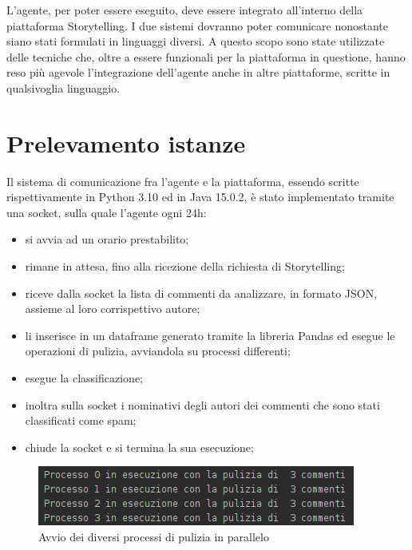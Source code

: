 \documentclass{report}
\begin{document}
    L'agente, per poter essere eseguito, deve essere integrato all'interno della piattaforma Storytelling.
    I due sistemi dovranno poter comunicare nonostante siano stati formulati in linguaggi diversi.
    \newline
    A questo scopo sono state utilizzate delle tecniche che, oltre a essere funzionali per la piattaforma in questione,
    hanno reso più agevole l'integrazione dell'agente anche in altre piattaforme, scritte in qualsivoglia linguaggio.

    \section{Prelevamento istanze}
    Il sistema di comunicazione fra l'agente e la piattaforma, essendo scritte rispettivamente in Python 3.10 ed in Java 15.0.2, è stato 
    implementato tramite una socket, sulla quale l'agente ogni 24h:
    \begin{itemize}
        \item si avvia ad un orario prestabilito;
        \item rimane in attesa, fino alla ricezione della richiesta di Storytelling;
        \item riceve dalla socket la lista di commenti da analizzare, in formato JSON, assieme al loro corrispettivo autore;
        \item li inserisce in un dataframe generato tramite la libreria Pandas ed esegue le operazioni di pulizia, avviandola su processi differenti;
        \item esegue la classificazione;
        \item inoltra sulla socket i nominativi degli autori dei commenti che sono stati classificati come spam;
        \item chiude la socket e si termina la sua esecuzione;
    \end{itemize}

    \begin{figure}[h!]
        \centering
        \includegraphics[width =\textwidth]{immagini/puliziaCommenti.png}
        \caption{Avvio dei diversi processi di pulizia in parallelo}

    \end{figure}
\end{document}
